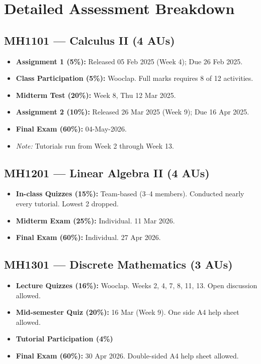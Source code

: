 \documentclass[a4paper,11pt]{article}
\begin{document}
\section{Detailed Assessment Breakdown}

\subsection*{MH1101 — Calculus II (4 AUs)}
\begin{itemize}
    \item \textbf{Assignment 1 (5\%):} Released 05 Feb 2025 (Week 4); Due 26 Feb 2025.
    \item \textbf{Class Participation (5\%):} Wooclap. Full marks requires 8 of 12 activities.
    \item \textbf{Midterm Test (20\%):} Week 8, Thu 12 Mar 2025.
    \item \textbf{Assignment 2 (10\%):} Released 26 Mar 2025 (Week 9); Due 16 Apr 2025.
    \item \textbf{Final Exam (60\%):} 04-May-2026.
    \item \textit{Note:} Tutorials run from Week 2 through Week 13.
\end{itemize}

\subsection*{MH1201 — Linear Algebra II (4 AUs)}
\begin{itemize}
    \item \textbf{In-class Quizzes (15\%):} Team-based (3--4 members). Conducted nearly every tutorial. Lowest 2 dropped.
    \item \textbf{Midterm Exam (25\%):} Individual. 11 Mar 2026.
    \item \textbf{Final Exam (60\%):} Individual. 27 Apr 2026.
\end{itemize}

\subsection*{MH1301 — Discrete Mathematics (3 AUs)}
\begin{itemize}
    \item \textbf{Lecture Quizzes (16\%):} Wooclap. Weeks 2, 4, 7, 8, 11, 13. Open discussion allowed.
    \item \textbf{Mid-semester Quiz (20\%):} 16 Mar (Week 9). One side A4 help sheet allowed.
    \item \textbf{Tutorial Participation (4\%)}
    \item \textbf{Final Exam (60\%):} 30 Apr 2026. Double-sided A4 help sheet allowed.
\end{itemize}
\end{document}
